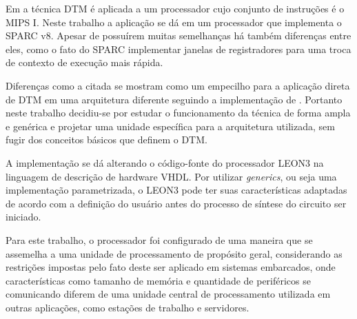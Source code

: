 Em  a técnica DTM é aplicada a um processador cujo conjunto de instruções é o MIPS I. Neste trabalho a aplicação se dá em um processador que implementa o SPARC v8. Apesar de possuírem muitas semelhanças há também diferenças entre eles, como o fato do SPARC implementar janelas de registradores para uma troca de contexto de execução mais rápida.

Diferenças como a citada se mostram como um empecilho para a aplicação direta de DTM em uma arquitetura diferente seguindo a implementação de \cite{costa2001explorando}. Portanto neste trabalho decidiu-se por estudar o funcionamento da técnica de forma ampla e genérica e projetar uma unidade específica para a arquitetura utilizada, sem fugir dos conceitos básicos que definem o DTM.

A implementação se dá alterando o código-fonte do processador LEON3 na linguagem de descrição de hardware VHDL. Por utilizar \textit{generics}, ou seja uma implementação parametrizada, o LEON3 pode ter suas características adaptadas de acordo com a definição do usuário antes do processo de síntese do circuito ser iniciado.

Para este trabalho, o processador foi configurado de uma maneira que se assemelha a uma unidade de processamento de propósito geral, considerando as restrições impostas pelo fato deste ser aplicado em sistemas embarcados, onde características como tamanho de memória e quantidade de periféricos se comunicando diferem de uma unidade central de processamento utilizada em outras aplicações, como estações de trabalho e servidores. %

